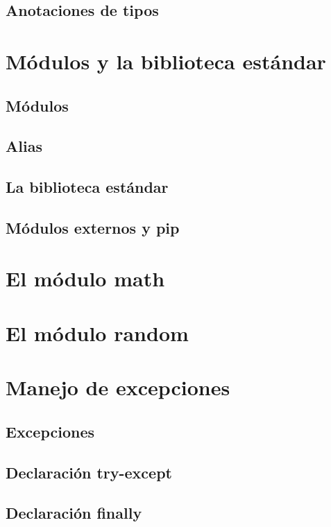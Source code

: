 \documentclass{article}
\begin{document}
      \subsection{Anotaciones de tipos}
    
    \section{Módulos y la biblioteca estándar}

      \subsection{Módulos}
      \subsection{Alias}
      \subsection{La biblioteca estándar}
      \subsection{Módulos externos y pip}
    
    \section{El módulo math}

    \section{El módulo random}

    \section{Manejo de excepciones}

      \subsection{Excepciones}
      \subsection{Declaración try-except}
      \subsection{Declaración finally}
\end{document}
